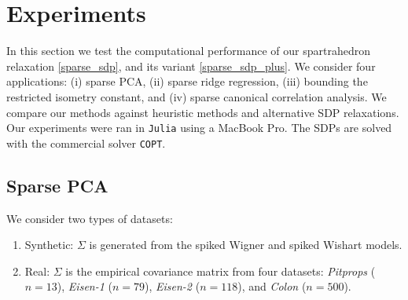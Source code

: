 \documentclass[11pt]{amsart}
\newcommand{\ourset}{spartrahedron\xspace}
\theoremstyle{plain}
\theoremstyle{definition}
\theoremstyle{remark}
\begin{document}
	\section{Experiments}\label{section:experiments}
	
	In this section we test the computational performance of our \ourset relaxation \eqref{sparse_sdp}, and its variant \eqref{sparse_sdp_plus}. We consider four applications: (i) sparse PCA, (ii) sparse ridge regression, (iii) bounding the restricted isometry constant,  and (iv) sparse canonical correlation analysis. We compare our methods against heuristic methods and alternative SDP relaxations. 
	Our experiments were ran in \texttt{Julia} using a MacBook Pro.
	The SDPs are solved with the commercial solver \texttt{COPT}.
	
	
	\subsection{Sparse PCA}
	We consider two types of datasets:
	\begin{enumerate}
		\item Synthetic: \(\Sigma\) is generated from the spiked Wigner and spiked Wishart models.
		\item Real: \(\Sigma\) is the empirical covariance matrix from four datasets: \emph{Pitprops} (\(n=13\)), \emph{Eisen-1} (\(n=79\)), \emph{Eisen-2} (\(n=118\)), and \emph{Colon} (\(n=500\)).
	\end{enumerate}
	
\end{document}
